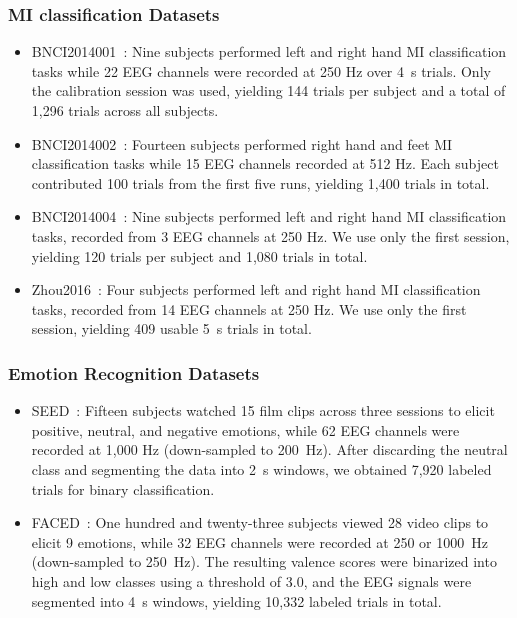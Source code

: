 \documentclass[journal]{IEEEtran}
\theoremstyle{plain}
\begin{document}
\subsubsection{MI classification Datasets}
    \begin{itemize}
        \item BNCI2014001~\cite{bnci2014001}: Nine subjects performed left and right hand MI classification tasks while 22 EEG channels were recorded at 250 Hz over 4~s trials. Only the calibration session was used, yielding 144 trials per subject and a total of 1,296 trials across all subjects.
        \item BNCI2014002~\cite{bnci2014002}: Fourteen subjects performed right hand and feet MI classification tasks while 15 EEG channels recorded at 512 Hz. Each subject contributed 100 trials from the first five runs, yielding 1,400 trials in total.
        \item BNCI2014004~\cite{bnci2014004}: Nine subjects performed left and right hand MI classification tasks, recorded from 3 EEG channels at 250 Hz. We use only the first session, yielding 120 trials per subject and 1,080 trials in total.
        \item Zhou2016~\cite{zhou2016}: Four subjects performed left and right hand MI classification tasks, recorded from 14 EEG channels at 250 Hz. We use only the first session, yielding 409 usable 5~s trials in total.
    \end{itemize}

\subsubsection{Emotion Recognition Datasets}
    \begin{itemize}
        \item SEED~\cite{seed}: Fifteen subjects watched 15 film clips across three sessions to elicit positive, neutral, and negative emotions, while 62 EEG channels were recorded at 1,000 Hz (down-sampled to 200~Hz). After discarding the neutral class and segmenting the data into 2~s windows, we obtained 7,920 labeled trials for binary classification.
        \item FACED~\cite{faced}: One hundred and twenty-three subjects viewed 28 video clips to elicit 9 emotions, while 32 EEG channels were recorded at 250 or 1000~Hz (down-sampled to 250~Hz). The resulting valence scores were binarized into high and low classes using a threshold of 3.0, and the EEG signals were segmented into 4~s windows, yielding 10,332 labeled trials in total.
    \end{itemize}
\end{document}
